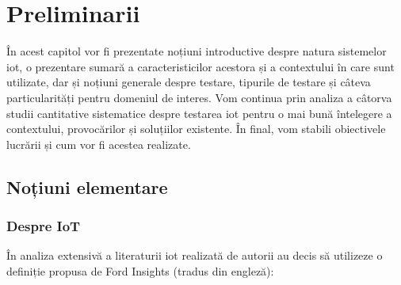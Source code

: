 \chapter{Preliminarii}

În acest capitol vor fi prezentate noțiuni introductive despre natura sistemelor \acrfull{iot}, o prezentare sumară a caracteristicilor acestora și a contextului în care sunt utilizate, dar și noțiuni generale despre testare, tipurile de testare și câteva particularități pentru domeniul de interes. Vom continua prin analiza a câtorva studii cantitative sistematice despre testarea \acrshort{iot} pentru o mai bună întelegere a contextului, provocărilor și soluțiilor existente. În final, vom stabili obiectivele lucrării și cum vor fi acestea realizate.


\section{Noțiuni elementare}

\subsection*{Despre IoT}


În analiza extensivă a literaturii \acrshort{iot} realizată de \cite{Nord2019} autorii au decis să utilizeze o definiție propusa de Ford Insights \cite{insight2017internet} (tradus din engleză):


